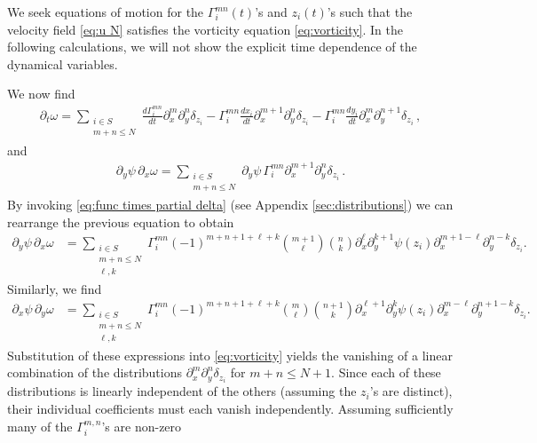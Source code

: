 \documentclass[12pt]{amsart}
\theoremstyle{remark}
\begin{document}
We seek equations of motion for the $\Gamma^{mn}_i(t)$'s and $z_i(t)$'s
such that the velocity field \eqref{eq:u N} satisfies the vorticity equation \eqref{eq:vorticity}.
In the following calculations, we will not show the explicit time dependence of the dynamical variables.


We now find
\begin{align*}
  \partial_t \omega =	
  \sum_{
  	\substack{
		i \in S \\
		m+n \leq N}}
  	\frac{d \Gamma_i^{mn}}{dt} \partial_x^m \partial_y^n \delta_{z_i} - \Gamma_i^{mn} \frac{dx_i}{dt} \partial_{x}^{m+1} \partial_y^{n} \delta_{z_i}
	- \Gamma_i^{mn} \frac{dy_i}{dt} \partial_{x}^{m} \partial_y^{n+1} \delta_{z_i}\,,
\end{align*}
and
\begin{align*}
  \partial_y \psi \, \partial_x \omega = 
  \sum_{
  	\substack{
		i \in S \\
		m+n \leq N}}
   \partial_y \psi \, \Gamma_i ^{mn}\partial_x^{m+1} \partial_y^n \delta_{z_i}\,.
\end{align*}
By invoking \eqref{eq:func times partial delta} (see Appendix
\ref{sec:distributions}) we can rearrange the previous equation to
obtain
\begin{align*}
  \partial_y \psi \, \partial_x \omega &=
  \sum_{
  	\substack{
		i \in S \\
		m+n \leq N \\
		\ell,k}}
	\Gamma_i^{mn} (-1)^{m+n+1 + \ell + k} \binom{m+1}{\ell} \binom{n}{k} \partial_x^{\ell} \partial_y^{k+1} \psi(z_i) \partial_x^{m+1-\ell} \partial_y^{n-k} \delta_{z_i}.
\end{align*}
Similarly, we find
\begin{align*}
  \partial_x \psi \, \partial_y \omega &=
  \sum_{
  	\substack{
		i \in S \\
		m+n \leq N\\
		\ell,k}
	}
	\Gamma_i^{mn} (-1)^{m+n+1 + \ell + k} \binom{m}{\ell} \binom{n+1}{k} \partial_x^{\ell+1} \partial_y^k \psi(z_i) \partial_x^{m-\ell} \partial_y^{n+1-k} \delta_{z_i}.
\end{align*}
Substitution of these expressions into \eqref{eq:vorticity} yields
the vanishing of a linear combination of the distributions
$\partial_x^m \partial_y^n \delta_{z_i}$
for $m+n \leq N+1$.
Since each of these distributions is linearly independent
of the others (assuming the $z_i$'s are distinct),
their individual coefficients must each vanish independently.
Assuming sufficiently many of the $\Gamma_i^{m,n}$'s are non-zero 
\end{document}
